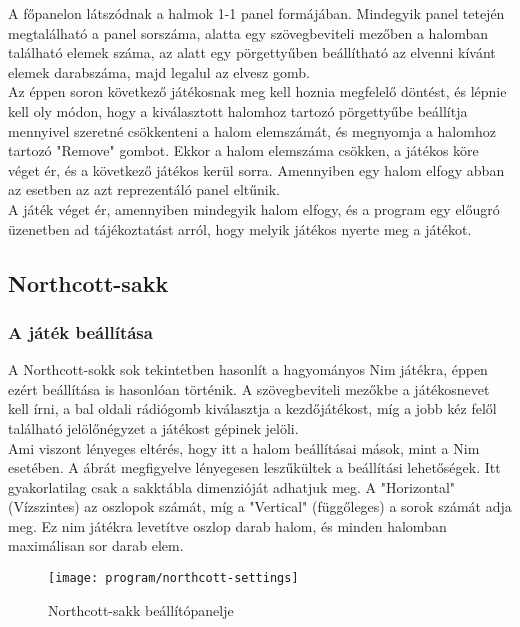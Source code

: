 A főpanelon látszódnak a halmok 1-1 panel formájában. Mindegyik panel tetején megtalálható a panel sorszáma, alatta egy szövegbeviteli mezőben a halomban található elemek száma, az alatt egy pörgettyűben beállítható az elvenni kívánt elemek darabszáma, majd legalul az elvesz gomb. \\

Az éppen soron következő játékosnak meg kell hoznia megfelelő döntést, és lépnie kell oly módon, hogy a kiválasztott halomhoz tartozó pörgettyűbe beállítja mennyivel szeretné csökkenteni a halom elemszámát, és megnyomja a halomhoz tartozó "Remove" gombot. Ekkor a halom elemszáma csökken, a játékos köre véget ér, és a következő játékos kerül sorra. Amennyiben egy halom elfogy abban az esetben az azt reprezentáló panel eltűnik.\\

A játék véget ér, amennyiben mindegyik halom elfogy, és a program egy előugró üzenetben ad tájékoztatást arról, hogy melyik játékos nyerte meg a játékot.

\subsection{Northcott-sakk}
\subsubsection*{A játék beállítása}
A Northcott-sokk sok tekintetben hasonlít a hagyományos Nim játékra, éppen ezért beállítása is hasonlóan történik. A szövegbeviteli mezőkbe a játékosnevet kell írni, a bal oldali rádiógomb kiválasztja a kezdőjátékost, míg a jobb kéz felől található jelölőnégyzet a játékost gépinek jelöli.\\

Ami viszont lényeges eltérés, hogy itt a halom beállításai mások, mint a Nim esetében. A  ábrát megfigyelve lényegesen leszűkültek a beállítási lehetőségek. Itt gyakorlatilag csak a sakktábla dimenzióját adhatjuk meg. A "Horizontal" (Vízszintes) az oszlopok számát, míg a "Vertical" (függőleges) a sorok számát adja meg. Ez nim játékra levetítve oszlop darab halom, és minden halomban maximálisan sor darab elem.

\begin{figure}[h]
	\texttt{[image: program/northcott-settings]}
	\centering
	\caption{Northcott-sakk beállítópanelje}
	\label{fig:northcott-settings}
\end{figure}

